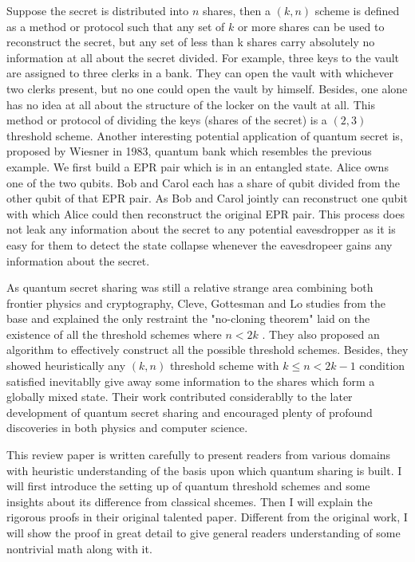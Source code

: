 \documentclass[12pt]{article}
\begin{document}
	Suppose the secret is distributed into $n$ shares, then a $(k,n)$ scheme is defined as a method or protocol such that any set of $k$ or more shares can be used to reconstruct the secret, but any set of less than k shares carry absolutely no information at all about the secret divided. 
	For example, three keys to the vault are assigned to three clerks in a bank. 
	They can open the vault with whichever two clerks present, but no one could open the vault by himself. 
	Besides, one alone has no idea at all about the structure of the locker on the vault at all. 
	This method or protocol of dividing the keys (shares of the secret) is a $(2,3)$ threshold scheme.
	Another interesting potential application of quantum secret is, proposed by Wiesner\cite{Wiesner} in 1983, quantum bank which resembles the previous example.
	We first build a EPR pair which is in an entangled state. Alice owns one of the two qubits. Bob and Carol each has a share of qubit divided from the other qubit of that EPR pair. As Bob and Carol jointly can reconstruct one qubit with which Alice could then reconstruct the original EPR pair. This process does not leak any information about the secret to any potential eavesdropper as it is easy for them to detect the state collapse whenever the eavesdropeer gains any information about the secret.

	As quantum secret sharing was still a relative strange area combining both frontier physics and cryptography, Cleve, Gottesman and Lo studies from the base and explained the only restraint the "no-cloning theorem" laid on the existence of all the threshold schemes where $n < 2k$ \cite{review}. They also proposed an algorithm to effectively construct all the possible threshold schemes. Besides, they showed heuristically any $(k, n)$ threshold scheme with $k \leq n < 2k-1$ condition satisfied inevitablly give away some information to the shares which form a globally mixed state. Their work contributed considerablly to the later development of quantum secret sharing and encouraged plenty of profound discoveries in both physics and computer science.

	This review paper is written carefully to present readers from various domains with heuristic understanding of the basis upon which quantum sharing is built. I will first introduce the setting up of quantum threshold schemes and some insights about its difference from classical shcemes. Then I will explain the rigorous proofs in their original talented paper. Different from the original work, I will show the proof in great detail to give general readers understanding of some nontrivial math along with it.\\
	
\end{document}

